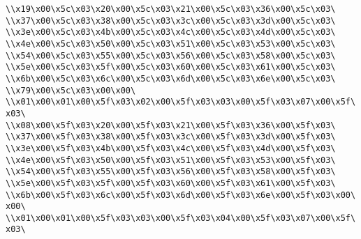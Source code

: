 \verb|\\x19\x00\x5c\x03\x20\x00\x5c\x03\x21\x00\x5c\x03\x36\x00\x5c\x03\|\newline
\verb|\\x37\x00\x5c\x03\x38\x00\x5c\x03\x3c\x00\x5c\x03\x3d\x00\x5c\x03\|\newline
\verb|\\x3e\x00\x5c\x03\x4b\x00\x5c\x03\x4c\x00\x5c\x03\x4d\x00\x5c\x03\|\newline
\verb|\\x4e\x00\x5c\x03\x50\x00\x5c\x03\x51\x00\x5c\x03\x53\x00\x5c\x03\|\newline
\verb|\\x54\x00\x5c\x03\x55\x00\x5c\x03\x56\x00\x5c\x03\x58\x00\x5c\x03\|\newline
\verb|\\x5e\x00\x5c\x03\x5f\x00\x5c\x03\x60\x00\x5c\x03\x61\x00\x5c\x03\|\newline
\verb|\\x6b\x00\x5c\x03\x6c\x00\x5c\x03\x6d\x00\x5c\x03\x6e\x00\x5c\x03\|\newline
\verb|\\x79\x00\x5c\x03\x00\x00\|\newline
\verb|\\x01\x00\x01\x00\x5f\x03\x02\x00\x5f\x03\x03\x00\x5f\x03\x07\x00\x5f\x03\|\newline
\verb|\\x08\x00\x5f\x03\x20\x00\x5f\x03\x21\x00\x5f\x03\x36\x00\x5f\x03\|\newline
\verb|\\x37\x00\x5f\x03\x38\x00\x5f\x03\x3c\x00\x5f\x03\x3d\x00\x5f\x03\|\newline
\verb|\\x3e\x00\x5f\x03\x4b\x00\x5f\x03\x4c\x00\x5f\x03\x4d\x00\x5f\x03\|\newline
\verb|\\x4e\x00\x5f\x03\x50\x00\x5f\x03\x51\x00\x5f\x03\x53\x00\x5f\x03\|\newline
\verb|\\x54\x00\x5f\x03\x55\x00\x5f\x03\x56\x00\x5f\x03\x58\x00\x5f\x03\|\newline
\verb|\\x5e\x00\x5f\x03\x5f\x00\x5f\x03\x60\x00\x5f\x03\x61\x00\x5f\x03\|\newline
\verb|\\x6b\x00\x5f\x03\x6c\x00\x5f\x03\x6d\x00\x5f\x03\x6e\x00\x5f\x03\x00\x00\|\newline
\verb|\\x01\x00\x01\x00\x5f\x03\x03\x00\x5f\x03\x04\x00\x5f\x03\x07\x00\x5f\x03\|\newline
